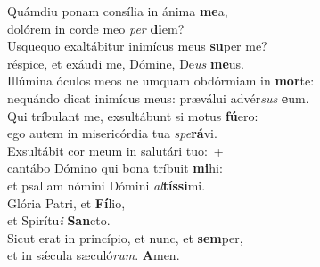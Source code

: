 \evenverse Quámdiu ponam consília in ánima \textbf{me}a,~\*\\
\evenverse dolórem in corde meo \textit{per} \textbf{di}em?\\
\oddverse Usquequo exaltábitur inimícus meus \textbf{su}per me?~\*\\
\oddverse réspice, et exáudi me, Dómine, De\textit{us} \textbf{me}us.\\
\evenverse Illúmina óculos meos ne umquam obdórmiam in \textbf{mor}te:~\*\\
\evenverse nequándo dicat inimícus meus: præválui advér\textit{sus} \textbf{e}um.\\
\oddverse Qui tríbulant me, exsultábunt si motus \textbf{fú}ero:~\*\\
\oddverse ego autem in misericórdia tua \textit{spe}\textbf{rá}vi.\\
\evenverse Exsultábit cor meum in salutári tuo:~+\\
\evenverse  cantábo Dómino qui bona tríbuit \textbf{mi}hi:~\*\\
\evenverse et psallam nómini Dómini \textit{al}\textbf{tís}\textbf{si}mi.\\
\oddverse Glória Patri, et \textbf{Fí}lio,~\*\\
\oddverse et Spirítu\textit{i} \textbf{San}cto.\\
\evenverse Sicut erat in princípio, et nunc, et \textbf{sem}per,~\*\\
\evenverse et in sǽcula sæculó\textit{rum}. \textbf{A}men.\\
